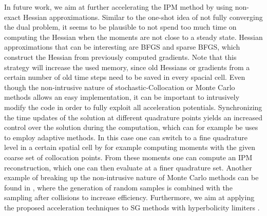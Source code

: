 In future work, we aim at further accelerating the IPM method by using non-exact Hessian approximations. Similar to the one-shot idea of not fully converging the dual problem, it seems to be plausible to not spend too much time on computing the Hessian when the moments are not close to a steady state. Hessian approximations that can be interesting are BFGS and sparse BFGS, which construct the Hessian from previously computed gradients. Note that this strategy will increase the used memory, since old Hessians or gradients from a certain number of old time steps need to be saved in every spacial cell.
Even though the non-intrusive nature of stochastic-Collocation or Monte Carlo methods allows an easy implementation, it can be important to intrusively modify the code in order to fully exploit all acceleration potentials. Synchronizing the time updates of the solution at different quadrature points yields an increased control over the solution during the computation, which can for example be uses to employ adaptive methods. In this case one can switch to a fine quadrature level in a certain spatial cell by for example computing moments with the given coarse set of collocation points. From these moments one can compute an IPM reconstruction, which one can then evaluate at a finer quadrature set. Another example of breaking up the non-intrusive nature of Monte Carlo methods can be found in \cite{poette2019gpc}, where the generation of random samples is combined with the sampling after collisions to increase efficiency. Furthermore, we aim at applying the proposed acceleration techniques to SG methods with hyperbolicity limiters \cite{wu2017stochastic,schlachter2018hyperbolicity}.